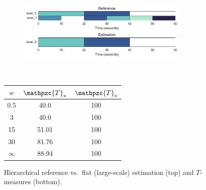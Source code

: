 \documentclass{article}
\def\shag{\ensuremath{\mathpzc{T}}}
\begin{document}
\begin{figure}
  \centering
  \begin{subfigure}{0.5\textwidth}
    \centering
    \includegraphics[width=0.94\textwidth]{figs/hier-flatlarge.pdf}
  \end{subfigure}%
  \\
  \begin{minipage}{0.5\textwidth}
    \centering
    \vspace{10pt}
    \begin{tabular}{|c|c|c|}
      \hline
      $w$       & $\shag_u$    & $\shag_o$      \\
      \hline
      0.5       & 40.0      & 100      \\     
      3         & 40.0      & 100      \\
      15        & 51.01     & 100    \\
      30        & 81.76     & 100    \\
      $\infty$  & 88.94     & 100    \\
      \hline
    \end{tabular}
  \end{minipage}
  \caption{Hierarchical reference vs.\ flat (large-scale) estimation (top) and $T$-measures (bottom).}
  \label{fig:hier-flatlarge}
\end{figure}
\end{document}
